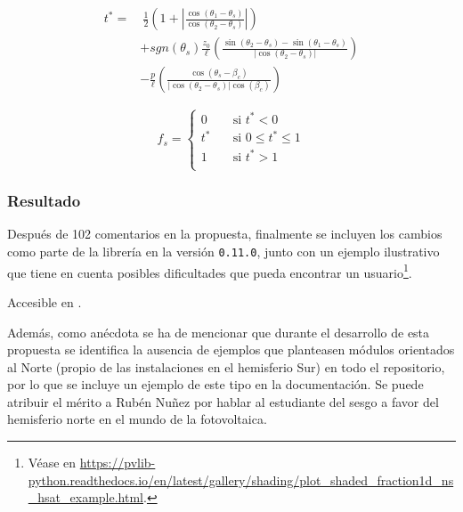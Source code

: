 \begin{equation} \label{eq:sombra_t}
    \begin{aligned}
        t^* = & \ \frac{1}{2} \left( 1 + \left|\frac{\cos(\theta_1 - \theta_s)}{\cos(\theta_2 - \theta_s)}\right| \right)                                            \\
              & + sgn(\theta_s) \frac{z_0}{\ell} \left( \frac{\sin(\theta_2 - \theta_s) - \sin(\theta_1 - \theta_s)}{\left|\cos(\theta_2 - \theta_s)\right|} \right) \\
              & - \frac{p}{\ell} \left( \frac{\cos(\theta_s - \beta_c)}{\left|\cos(\theta_2 - \theta_s)\right| \cos(\beta_c)} \right)
    \end{aligned}
\end{equation}

\begin{equation} \label{eq:sombra_clip}
    f_s =
    \begin{cases}
        0   & \quad \text{si } t^* < 0 \\
        t^* & \quad \text{si } 0 \leq t^* \leq 1  \\
        1   & \quad \text{si } t^* > 1 \\
    \end{cases}
\end{equation}

\subsubsection{Resultado}

Después de 102 comentarios en la propuesta, finalmente se incluyen los cambios como parte de la librería en la versión \texttt{0.11.0}, junto con un ejemplo ilustrativo que tiene en cuenta posibles dificultades que pueda encontrar un usuario\footnote{Véase en \url{https://pvlib-python.readthedocs.io/en/latest/gallery/shading/plot_shaded_fraction1d_ns_hsat_example.html}.}.

Accesible en .

Además, como anécdota se ha de mencionar que durante el desarrollo de esta propuesta se identifica la ausencia de ejemplos que planteasen módulos orientados al Norte (propio de las instalaciones en el hemisferio Sur) en todo el repositorio, por lo que se incluye un ejemplo de este tipo en la documentación. Se puede atribuir el mérito a Rubén Nuñez por hablar al estudiante del sesgo a favor del hemisferio norte en el mundo de la fotovoltaica.

